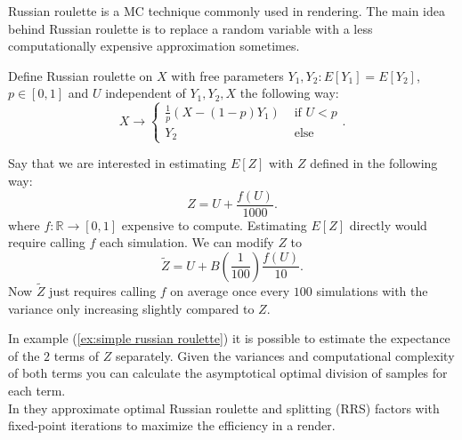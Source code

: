 \documentclass[a4paper,12pt]{article}
\begin{document}
Russian roulette is a MC technique commonly used in rendering.
The main idea behind Russian roulette is to replace a random variable
with a less computationally expensive approximation sometimes.

\begin{definition} \label{Russian roulette}
    Define Russian roulette on $X$ with free parameters
    $Y_{1},Y_{2}: E[Y_{1}] = E[Y_{2}]$, $p \in [0,1]$ and $U$
    independent of $Y_{1},Y_{2},X$ the following way:
    \begin{equation}
        X \rightarrow \begin{cases}
            \frac{1}{p}(X- (1-p)Y_{1}) & \text{ if } U<p \\
            Y_{2}                      & \text{ else }
        \end{cases}.
    \end{equation}
\end{definition}

\begin{example} \label{ex:simple russian roulette}
    Say that we are interested in estimating $E[Z]$ with $Z$
    defined in the following way:
    \begin{equation}
        Z = U + \frac{f(U)}{1000}.
    \end{equation}
    where $f:\mathbb{R} \rightarrow [0,1]$ expensive to compute.
    Estimating $E[Z]$ directly would require calling $f$ each
    simulation. We can modify $Z$ to
    \begin{equation}
        \tilde{Z} = U + B\left(\frac{1}{100}\right)\frac{f(U)}{10}.
    \end{equation}
    Now $\tilde{Z}$
    just requires calling $f$ on average once every $100$ simulations with the variance
    only increasing slightly compared to $Z$. \\

\end{example}

\begin{related}
    In example (\ref{ex:simple russian roulette}) it is possible to estimate
    the expectance of the $2$ terms of $Z$ separately. Given the variances and
    computational complexity  of both terms you can calculate the asymptotical optimal
    division of samples for each term. \\
    In \cite{rath_ears_2022} they approximate optimal Russian roulette and splitting
    (RRS) factors with fixed-point iterations to maximize the efficiency in a render.
\end{related}
\end{document}
